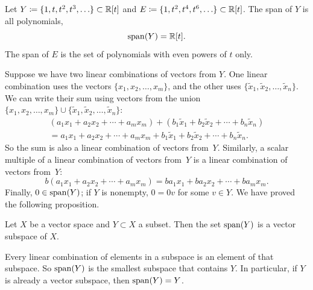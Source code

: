 \begin{example}
Let $Y \coloneqq \{ 1, t, t^2, t^3, \ldots \} \subset {\mathbb{R}}[t]$ and
$E \coloneqq \{ 1, t^2, t^4, t^6, \ldots \} \subset {\mathbb{R}}[t]$.
The span of $Y$ is all polynomials,
\begin{equation*}
\operatorname{span}(Y) = {\mathbb{R}}[t] .
\end{equation*}
The span of $E$ is the set of polynomials with even powers of $t$ only.
\end{example}

Suppose we have two linear combinations of vectors from $Y$.  One linear
combination uses the vectors $\{ x_1,x_2,\ldots,x_m \}$, and the other uses
$\{ \widetilde{x}_1,\widetilde{x}_2,\ldots,\widetilde{x}_n \}$.  We can write
their sum using vectors from the union
$\{ x_1,x_2,\ldots,x_m \} \cup
\{ \widetilde{x}_1,\widetilde{x}_2,\ldots,\widetilde{x}_n \}$:
\begin{multline*}
(a_1 x_1 + 
a_2 x_2 +  \cdots
+ a_m x_m)
+
(b_1 \widetilde{x}_1 + 
b_2 \widetilde{x}_2 +  \cdots
+ b_n \widetilde{x}_n)
\\
=
a_1 x_1 + 
a_2 x_2 +  \cdots
+ a_m x_m
+
b_1 \widetilde{x}_1 + 
b_2 \widetilde{x}_2 +  \cdots
+ b_n \widetilde{x}_n .
\end{multline*}
So the sum is also a linear combination of vectors from~$Y$.
Similarly,
a scalar multiple of a linear combination of vectors from~$Y$
is a linear combination of vectors from~$Y$:
\begin{equation*}
b (a_1 x_1 + 
a_2 x_2 +  \cdots
+ a_m x_m)
=
b a_1  x_1 + 
b a_2 x_2 +  \cdots
+ b a_m x_m .
\end{equation*}
Finally, $0 \in \operatorname{span}(Y)$; if $Y$ is nonempty, $0 = 0 v$ for some $v \in Y$.
We have proved the following proposition.

\begin{prop}
Let $X$ be a vector space and $Y \subset X$ a subset.
Then the set $\operatorname{span}(Y)$ is a vector subspace of $X$.
\end{prop}

Every linear combination of elements in a subspace is an element of that
subspace.  So $\operatorname{span}(Y)$ is the smallest subspace that contains $Y$.
In particular,
if $Y$ is already a vector subspace, then $\operatorname{span}(Y) = Y$.

